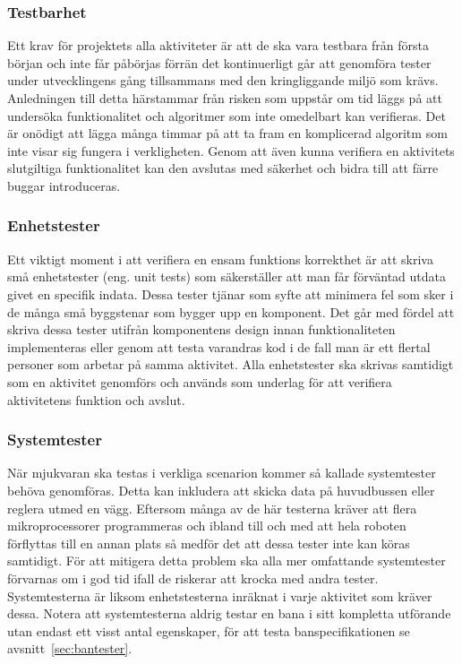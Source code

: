 \documentclass{article}
\begin{document}
\subsubsection{Testbarhet}
\label{sec:testbarhet}
Ett krav för projektets alla aktiviteter är att de ska vara testbara från första början och inte får påbörjas förrän det kontinuerligt går att genomföra tester under utvecklingens gång tillsammans med den kringliggande miljö som krävs. Anledningen till detta härstammar från risken som uppstår om tid läggs på att undersöka funktionalitet och algoritmer som inte omedelbart kan verifieras. Det är onödigt att lägga många timmar på att ta fram en komplicerad algoritm som inte visar sig fungera i verkligheten. Genom att även kunna verifiera en aktivitets slutgiltiga funktionalitet kan den avslutas med säkerhet och bidra till att färre buggar introduceras.

\subsubsection{Enhetstester}
Ett viktigt moment i att verifiera en ensam funktions korrekthet är att skriva små enhetstester (eng. unit tests) som säkerställer att man får förväntad utdata givet en specifik indata. Dessa tester tjänar som syfte att minimera fel som sker i de många små byggstenar som bygger upp en komponent. Det går med fördel att skriva dessa tester utifrån komponentens design innan funktionaliteten implementeras eller genom att testa varandras kod i de fall man är ett flertal personer som arbetar på samma aktivitet. Alla enhetstester ska skrivas samtidigt som en aktivitet genomförs och används som underlag för att verifiera aktivitetens funktion och avslut.

\subsubsection{Systemtester}
När mjukvaran ska testas i verkliga scenarion kommer så kallade systemtester behöva genomföras. Detta kan inkludera att skicka data på huvudbussen eller reglera utmed en vägg. Eftersom många av de här testerna kräver att flera mikroprocessorer programmeras och ibland till och med att hela roboten förflyttas till en annan plats så medför det att dessa tester inte kan köras samtidigt. För att mitigera detta problem ska alla mer omfattande systemtester förvarnas om i god tid ifall de riskerar att krocka med andra tester. Systemtesterna är liksom enhetstesterna inräknat i varje aktivitet som kräver dessa. Notera att systemtesterna aldrig testar en bana i sitt kompletta utförande utan endast ett visst antal egenskaper, för att testa banspecifikationen se avsnitt~\ref{sec:bantester}.
\end{document}
